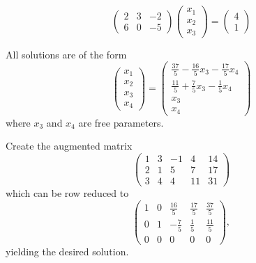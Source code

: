\documentclass{ximera}
\begin{document}
\[
\left(\begin{array}{rrr} 2 & 3 & -2 \\ 6 & 0 & -5\end{array}\right) 
\left(\begin{array}{r} x_1 \\ x_2 \\ x_3\end{array}\right) = 
\left(\begin{array}{r} 4 \\ 1\end{array}\right)
\]


\ans All solutions are of the form
\[ \left(\begin{array}{r} x_1 \\ x_2 \\ x_3 \\ x_4\end{array}\right) =
\left(\begin{array}{c} \frac{37}{5} - \frac{16}{5}x_3 - \frac{17}{5}x_4 \\
\frac{11}{5} + \frac{7}{5}x_3 - \frac{1}{5}x_4 \\ x_3 \\ x_4\end{array}\right)
\]
where $x_3$ and $x_4$ are free parameters.

\soln Create the augmented matrix
\[ \left(\begin{array}{rrrr|r}
1 & 3 & -1 & 4 & 14 \\
2 & 1 & 5 & 7 & 17 \\
3 & 4 & 4 & 11 & 31\end{array}\right) \]
which can be row reduced to
\[ \left(\begin{array}{rrrr|r}
1 & 0 & \frac{16}{5} & \frac{17}{5} & \frac{37}{5} \\
0 & 1 & -\frac{7}{5} & \frac{1}{5} & \frac{11}{5} \\
0 & 0 & 0 & 0 & 0\end{array}\right), \]
yielding the desired solution.
\end{document}
